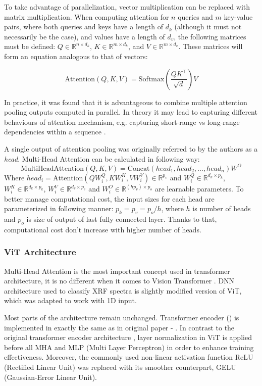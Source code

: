 To take advantage of parallelization, vector multiplication can be replaced with matrix multiplication. When computing attention for $n$ queries and $m$ key-value pairs, where both queries and keys have a length of $d_k$ (although it must not necessarily be the case), and values have a length of $d_v$, the following matrices must be defined: $Q \in \mathbb{R}^{n \times d_k}$, $K \in \mathbb{R}^{m \times d_k}$, and $V \in \mathbb{R}^{m \times d_v}$. These matrices will form an equation analogous to that of vectors:

\[\text{Attention}(Q, K, V) = \text{Softmax}(\frac{Q K^\intercal}{\sqrt{d}})V \]

In practice, it was found that it is advantageous to combine multiple attention pooling outputs computed in parallel. 
In theory it may lead to capturing different behaviours of attention mechanism, e.g. capturing short-range vs long-range dependencies within a sequence \cite{d2lMultiHeadAttention}.


A single output of attention pooling was originally referred to by the authors as a \emph{head}. 
Multi-Head Attention can be calculated in following way: 
\[\text{MultiHeadAttention}(Q, K, V)  = \text{Concat}(head_1, head_2, \dots, head_n)W^O\]
Where $head_i = \text{Attention}(QW_i^Q, KW_i^K, VW_i^V) \in \mathbb{R}^{p_v}$  and $W_i^Q \in \mathbb{R}^{d_k \times p_k}$, $W_i^K \in \mathbb{R}^{d_k \times p_k}$, $W_i^V \in \mathbb{R}^{d_v \times p_v}$ and $W_i^O \in \mathbb{R}^{(hp_v) \times p_o}$ are learnable parameters.
To better manage computational cost, the input sizes for each head are parameterized in following manner: $p_k = p_v = p_o / h$, where $h$ is number of heads and $p_o$ is size of output of last fully connected layer. Thanks to that, computational cost don't increase with higher number of heads.

\subsubsection{ViT Architecture}
Multi-Head Attention is the most important concept used in transformer architecture, it is no different when it comes to Vision Transformer \cite{vitPaper}.
DNN architecture used to classify XRF spectra is slightly modified version of ViT, which was adapted to work with 1D input.

Most parts of the architecture remain unchanged.
Transformer encoder () is implemented in exactly the same as in original paper - .
In contrast to the original transformer encoder architecture \cite{Vaswani2017}, layer normalization in ViT is applied before all MHA and MLP (Multi Layer Perceptron) in order to enhance training effectiveness.
Moreover, the commonly used non-linear activation function ReLU (Rectified Linear Unit) was replaced with its smoother counterpart, GELU (Gaussian-Error Linear Unit).

